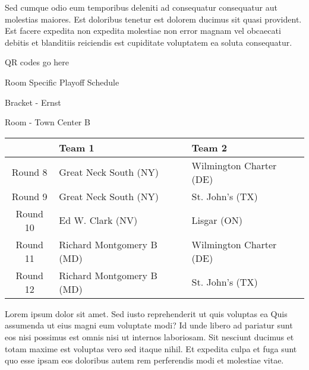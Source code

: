 \documentclass{article}%
\begin{document}
\newline%
Sed cumque odio eum temporibus deleniti ad consequatur consequatur aut molestias maiores. Est doloribus tenetur est dolorem ducimus sit quasi provident. Est facere expedita non expedita molestiae non error magnam vel obcaecati debitis et blanditiis reiciendis est cupiditate voluptatem ea soluta consequatur.%
\vspace*{140pt}%
\begin{center}%
\begin{Huge}%
QR codes go here%
\end{Huge}%
\end{center}%
\newpage%
\begin{center}%
\begin{Huge}%
Room Specific Playoff Schedule%
\end{Huge}%
\vspace*{8pt}%
\linebreak%
\begin{Large}%
Bracket {-} Ernst%
\end{Large}%
\vspace*{8pt}%
\linebreak%
\vspace*{8pt}%
\begin{Large}%
Room {-} Town Center B%
\end{Large}%
\end{center}%
%
\begin{tabularx}{\textwidth}{|c|Y|Y|}%
\hline%
&Team 1&Team 2\\%
\hline%
Round 8&Great Neck South (NY)&Wilmington Charter (DE)\\%
Round 9&Great Neck South (NY)&St. John's (TX)\\%
Round 10&Ed W. Clark (NV)&Lisgar (ON)\\%
Round 11&Richard Montgomery B (MD)&Wilmington Charter (DE)\\%
Round 12&Richard Montgomery B (MD)&St. John's (TX)\\%
\hline%
\end{tabularx}%
\vspace*{8pt}%
\newline%
Lorem ipsum dolor sit amet. Sed iusto reprehenderit ut quis voluptas ea Quis assumenda ut eius magni eum voluptate modi? Id unde libero ad pariatur sunt eos nisi possimus est omnis nisi ut internos laboriosam. Sit nesciunt ducimus et totam maxime est voluptas vero sed itaque nihil. Et expedita culpa et fuga sunt quo esse ipsam eos doloribus autem rem perferendis modi et molestiae vitae.\newline%
\end{document}
